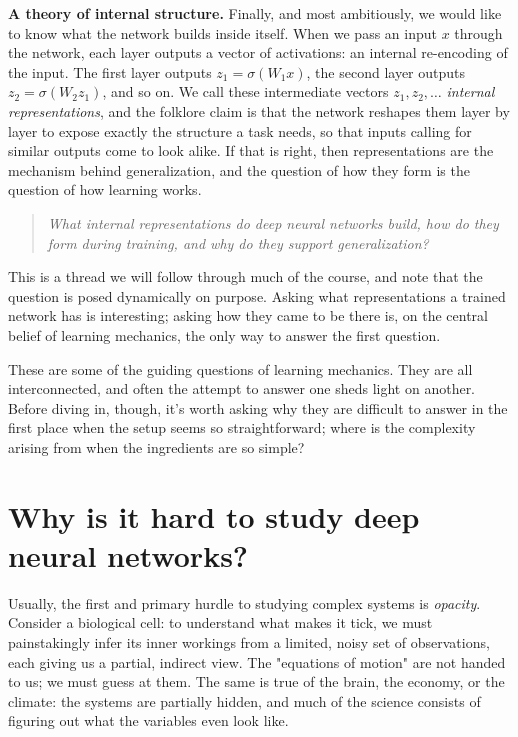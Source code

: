 \textbf{A theory of internal structure.} Finally, and most ambitiously, we would like to know what the network builds inside itself. When we pass an input $x$ through the network, each layer outputs a vector of activations: an internal re-encoding of the input. The first layer outputs $z_1 = \sigma(W_1x)$, the second layer outputs $z_2 = \sigma(W_2z_1)$, and so on. We call these intermediate vectors $z_1, z_2,\dots$ \textit{internal representations}, and the folklore claim is that the network reshapes them layer by layer to expose exactly the structure a task needs, so that inputs calling for similar outputs come to look alike. If that is right, then representations are the mechanism behind generalization, and the question of how they form is the question of how learning works.

\begin{quote}
\textit{What internal representations do deep neural networks build, how do they form during training, and why do they support generalization?}
\end{quote}

This is a thread we will follow through much of the course, and note that the question is posed dynamically on purpose. Asking what representations a trained network has is interesting; asking how they came to be there is, on the central belief of learning mechanics, the only way to answer the first question.

These are some of the guiding questions of learning mechanics. They are all interconnected, and often the attempt to answer one sheds light on another. Before diving in, though, it's worth asking why they are difficult to answer in the first place when the setup seems so straightforward; where is the complexity arising from when the ingredients are so simple?

\section{Why is it hard to study deep neural networks?} 
\label{difficulties}
Usually, the first and primary hurdle to studying complex systems is \textit{opacity}. Consider a biological cell: to understand what makes it tick, we must painstakingly infer its inner workings from a limited, noisy set of observations, each giving us a partial, indirect view. The "equations of motion" are not handed to us; we must guess at them. The same is true of the brain, the economy, or the climate: the systems are partially hidden, and much of the science consists of figuring out what the variables even look like.

